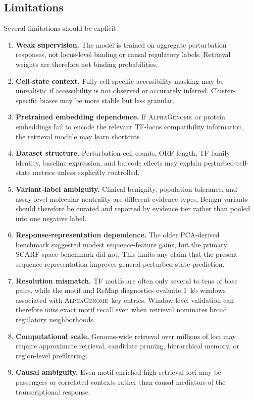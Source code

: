 \documentclass[11pt]{article}
\newcommand{\ag}{\textsc{AlphaGenome}}
\newcommand{\scarf}{\textsc{SCARF}}
\begin{document}
\subsection{Limitations}

Several limitations should be explicit.
\begin{enumerate}
    \item \textbf{Weak supervision.} The model is trained on aggregate perturbation responses, not locus-level binding or causal regulatory labels. Retrieval weights are therefore not binding probabilities.
    \item \textbf{Cell-state context.} Fully cell-specific accessibility masking may be unrealistic if accessibility is not observed or accurately inferred. Cluster-specific biases may be more stable but less granular.
    \item \textbf{Pretrained embedding dependence.} If \ag\ or protein embeddings fail to encode the relevant TF-locus compatibility information, the retrieval module may learn shortcuts.
    \item \textbf{Dataset structure.} Perturbation cell counts, ORF length, TF family identity, baseline expression, and barcode effects may explain perturbed-cell-state metrics unless explicitly controlled.
    \item \textbf{Variant-label ambiguity.} Clinical benignity, population tolerance, and assay-level molecular neutrality are different evidence types. Benign variants should therefore be curated and reported by evidence tier rather than pooled into one negative label.
    \item \textbf{Response-representation dependence.} The older PCA-derived benchmark suggested modest sequence-feature gains, but the primary \scarf-space benchmark did not. This limits any claim that the present sequence representation improves general perturbed-state prediction.
    \item \textbf{Resolution mismatch.} TF motifs are often only several to tens of base pairs, while the motif and ReMap diagnostics evaluate 1~kb windows associated with \ag\ key entries. Window-level validation can therefore miss exact motif recall even when retrieval nominates broad regulatory neighborhoods.
    \item \textbf{Computational scale.} Genome-wide retrieval over millions of loci may require approximate retrieval, candidate pruning, hierarchical memory, or region-level prefiltering.
    \item \textbf{Causal ambiguity.} Even motif-enriched high-retrieval loci may be passengers or correlated contexts rather than causal mediators of the transcriptional response.
\end{enumerate}
\end{document}
